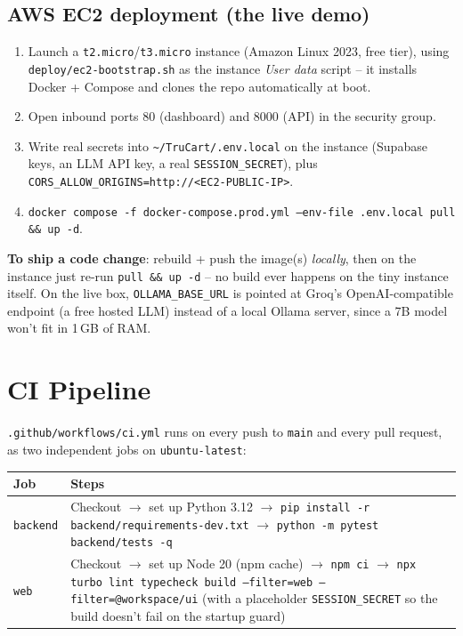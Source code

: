 \documentclass[11pt,a4paper]{article}
\begin{document}
\subsection{AWS EC2 deployment (the live demo)}
\begin{enumerate}[itemsep=2pt]
\item Launch a \texttt{t2.micro}/\texttt{t3.micro} instance (Amazon Linux 2023, free tier),
using \texttt{deploy/ec2-bootstrap.sh} as the instance \emph{User data} script -- it installs
Docker + Compose and clones the repo automatically at boot.
\item Open inbound ports 80 (dashboard) and 8000 (API) in the security group.
\item Write real secrets into \texttt{\textasciitilde/TruCart/.env.local} on the instance
(Supabase keys, an LLM API key, a real \texttt{SESSION\_SECRET}), plus
\texttt{CORS\_ALLOW\_ORIGINS=http://<EC2-PUBLIC-IP>}.
\item \texttt{docker compose -f docker-compose.prod.yml --env-file .env.local pull \&\& up -d}.
\end{enumerate}
\textbf{To ship a code change}: rebuild + push the image(s) \emph{locally}, then on the
instance just re-run \texttt{pull \&\& up -d} -- no build ever happens on the tiny instance
itself. On the live box, \texttt{OLLAMA\_BASE\_URL} is pointed at Groq's OpenAI-compatible
endpoint (a free hosted LLM) instead of a local Ollama server, since a 7B model won't fit in
1\,GB of RAM.

\section{CI Pipeline}

\texttt{.github/workflows/ci.yml} runs on every push to \texttt{main} and every pull request,
as two independent jobs on \texttt{ubuntu-latest}:

\begin{center}
\begin{tabular}{@{}p{2.4cm}p{9.6cm}@{}}
\toprule
\textbf{Job} & \textbf{Steps} \\
\midrule
\texttt{backend} & Checkout $\to$ set up Python 3.12 $\to$
\texttt{pip install -r backend/requirements-dev.txt} $\to$
\texttt{python -m pytest backend/tests -q} \\
\texttt{web} & Checkout $\to$ set up Node 20 (npm cache) $\to$ \texttt{npm ci} $\to$
\texttt{npx turbo lint typecheck build --filter=web --filter=@workspace/ui} (with a
placeholder \texttt{SESSION\_SECRET} so the build doesn't fail on the startup guard) \\
\bottomrule
\end{tabular}
\end{center}
\end{document}
